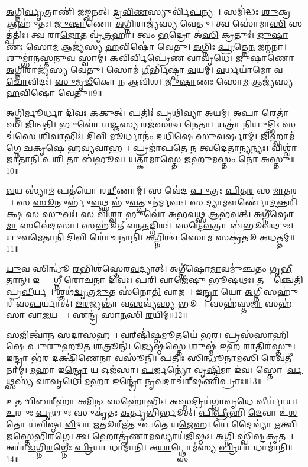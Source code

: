 \ul{𑌅}𑌗𑍍𑌨𑌿\ul{𑌰𑍍𑌵𑍃}𑌤𑍍𑌰𑌾𑌣𑌿॑ 𑌜𑌙𑍍𑌘𑌨𑌤𑍍।
\ul{𑌦𑍍𑌰}\ul{𑌵𑌿}\ul{𑌣}𑌸𑍍𑌯𑍁𑌰𑍍𑌵𑌿॑\ul{𑌪}𑌨𑍍𑌯𑌯𑌾᳚।
𑌸𑌮𑌿॑𑌦𑍍𑌧𑌃 \ul{𑌶𑍁}𑌕𑍍𑌰 𑌆𑌹𑍁॑𑌤𑌃।
\ul{𑌜𑍁}\ul{𑌷𑌾}𑌣𑍋 \ul{𑌅}𑌗𑍍𑌨𑌿𑌰𑌾𑌜𑍍𑌯॑𑌸𑍍𑌯 𑌵𑍇𑌤𑍁।
𑌤𑍍𑌵 𑌸𑍋॑𑌮𑌾\ul{𑌸𑌿} 𑌸𑌤𑍍𑌪॑𑌤𑌿𑌃।
𑌤𑍍𑌵 𑌰𑌾\ul{𑌜𑍋}𑌤 𑌵𑍃॑\ul{𑌤𑍍𑌰}𑌹𑌾।
𑌤𑍍𑌵𑌂 \ul{𑌭}𑌦𑍍𑌰𑍋 𑌅॑\ul{𑌸𑌿} 𑌕𑍍𑌰𑌤𑍁𑌃॑।
\ul{𑌜𑍁}\ul{𑌷𑌾}𑌣𑌃 𑌸𑍋\ul{𑌮} 𑌆𑌜𑍍𑌯॑𑌸𑍍𑌯 \ul{𑌹}𑌵𑌿𑌷𑍋॑ 𑌵𑍇𑌤𑍁।
\ul{𑌅}𑌗𑍍𑌨𑌿𑌃 \ul{𑌪𑍍𑌰}𑌤𑍍𑌨𑍇\ul{𑌨} 𑌜𑌨𑍍𑌮॑𑌨𑌾।
𑌶𑍁𑌮𑍍𑌭𑌾॑𑌨\ul{𑌸𑍍𑌤}𑌨𑍁\ul{𑌵}\ul{} 𑌸𑍍𑌵𑌾𑌮𑍍।
\ul{𑌕}𑌵𑌿𑌰𑍍𑌵𑌿𑌪𑍍𑌰𑍇॑𑌣 𑌵𑌾𑌵𑍃𑌧𑍇।
\ul{𑌜𑍁}\ul{𑌷𑌾}𑌣𑍋 \ul{𑌅}𑌗𑍍𑌨𑌿𑌰𑌾𑌜𑍍𑌯॑𑌸𑍍𑌯 𑌵𑍇𑌤𑍁।
𑌸𑍋𑌮॑ \ul{𑌗𑍀}𑌰𑍍𑌭𑌿𑌷𑍍𑌟𑍍𑌵𑌾॑ \ul{𑌵}𑌯𑌮𑍍।
\ul{𑌵}𑌰𑍍𑌧𑌯𑌾॑𑌮𑍋 𑌵\ul{𑌚𑍋}𑌵𑌿𑌦𑌃॑।
\ul{𑌸𑍁}\ul{𑌮𑍃}\ul{𑌡𑍀}𑌕𑍋 \ul{𑌨} 𑌆𑌵𑌿॑𑌶।
\ul{𑌜𑍁}\ul{𑌷𑌾}𑌣𑌃 𑌸𑍋\ul{𑌮} 𑌆𑌜𑍍𑌯॑𑌸𑍍𑌯 \ul{𑌹}𑌵𑌿𑌷𑍋॑ 𑌵𑍇𑌤𑍁॥9॥\anuvakamend[𑌸𑍍𑌵𑌾\dng{ꣳ} 𑌷𑌟𑍍 𑌚॑]

\ul{𑌅}𑌗𑍍𑌨𑌿\ul{𑌰𑍍𑌮𑍂}𑌰𑍍𑌧𑌾 \ul{𑌦𑌿}𑌵𑌃 \ul{𑌕}𑌕𑍁𑌤𑍍।
𑌪𑌤𑌿𑌃॑ 𑌪𑍃\ul{𑌥𑌿}𑌵𑍍𑌯𑌾 \ul{𑌅}𑌯𑌮𑍍।
\ul{𑌅}𑌪𑌾 𑌰𑍇𑌤𑌾॑𑌸𑌿 𑌜𑌿𑌨𑍍𑌵𑌤𑌿।
𑌭𑍁𑌵𑍋॑ \ul{𑌯}𑌜𑍍𑌞\ul{𑌸𑍍𑌯} 𑌰𑌜॑𑌸𑌶𑍍𑌚 \ul{𑌨𑍇}𑌤𑌾।
𑌯𑌤𑍍𑌰𑌾॑ \ul{𑌨𑌿}𑌯𑍁\ul{𑌦𑍍𑌭𑌿𑌃} 𑌸𑌚॑𑌸𑍇 \ul{𑌶𑌿}𑌵𑌾𑌭𑌿𑌃॑।
\ul{𑌦𑌿}𑌵𑌿 \ul{𑌮𑍂}𑌰𑍍𑌧𑌾𑌨𑌂॑ 𑌦𑌧𑌿𑌷𑍇 𑌸𑍁\ul{𑌵}\ul{𑌰𑍍}𑌷𑌾𑌮𑍍।
\ul{𑌜𑌿}𑌹𑍍𑌵𑌾𑌮॑𑌗𑍍𑌨𑍇 𑌚𑌕𑍃𑌷𑍇 𑌹\ul{𑌵𑍍𑌯}𑌵𑌾𑌹𑌮𑍍᳚।
𑌪𑍍𑌰𑌜𑌾॑𑌪\ul{𑌤𑍇} 𑌨 𑌤𑍍𑌵\ul{𑌦𑍇}𑌤𑌾\ul{𑌨𑍍𑌯}𑌨𑍍𑌯𑌃।
𑌵𑌿𑌶𑍍𑌵𑌾॑ \ul{𑌜𑌾}𑌤𑌾\ul{𑌨𑌿} 𑌪\ul{𑌰𑌿} 𑌤𑌾 𑌬॑𑌭𑍂𑌵।
𑌯𑌤𑍍𑌕𑌾॑𑌮𑌾𑌸𑍍𑌤𑍇 𑌜\ul{𑌹𑍁}𑌮𑌸𑍍𑌤𑌂 𑌨𑍋॑ 𑌅𑌸𑍍𑌤𑍁॥10॥

\ul{𑌵}𑌯 𑌸𑍍𑌯𑌾॑\ul{𑌮} 𑌪𑌤॑𑌯𑍋 𑌰\ul{𑌯𑍀}𑌣𑌾𑌮𑍍।
𑌸 𑌵𑍇॑𑌦 \ul{𑌪𑍁}𑌤𑍍𑌰𑌃 \ul{𑌪𑌿}𑌤\ul{𑌰}\ul{} 𑌸 \ul{𑌮𑌾}𑌤𑌰𑌮𑍍᳚।
𑌸 \ul{𑌸𑍂}𑌨𑍁𑌰𑍍𑌭𑍁॑\ul{𑌵}𑌥𑍍𑌸 𑌭𑍁॑\ul{𑌵}𑌤𑍍𑌪𑍁𑌨॑𑌰𑍍𑌮𑌘𑌃।
𑌸 𑌦𑍍𑌯𑌾𑌮𑍗𑌰𑍍𑌣𑍋॑\ul{𑌦}𑌨𑍍𑌤𑌰𑌿॑\ul{𑌕𑍍𑌷}\ul{} 𑌸 𑌸𑍁𑌵𑌃॑।
𑌸 𑌵𑌿\ul{𑌶𑍍𑌵𑌾} 𑌭𑍁𑌵𑍋॑ 𑌅𑌭\ul{𑌵}𑌥𑍍𑌸 𑌆𑌭॑𑌵𑌤𑍍।
𑌅𑌗𑍍𑌨𑍀॑𑌷𑍋\ul{𑌮𑌾} 𑌸𑌵𑍇॑𑌦𑌸𑌾।
𑌸𑌹𑍂॑𑌤𑍀 𑌵𑌨\ul{𑌤}𑌙𑍍𑌗𑌿𑌰𑌃॑।
𑌸𑌨𑍍𑌦𑍇॑\ul{𑌵}𑌤𑍍𑌰𑌾 𑌬॑𑌭𑍂𑌵𑌥𑍁𑌃।
\ul{𑌯𑍁}𑌵\ul{𑌮𑍇}𑌤𑌾𑌨𑌿॑ \ul{𑌦𑌿}𑌵𑌿 𑌰𑍋॑\ul{𑌚}𑌨𑌾𑌨𑌿॑।
\ul{𑌅}𑌗𑍍𑌨𑌿𑌶𑍍𑌚॑ 𑌸𑍋\ul{𑌮} 𑌸𑌕𑍍𑌰॑𑌤𑍂 𑌅𑌧𑌤𑍍𑌤𑌮𑍍॥11॥

\ul{𑌯𑍁}𑌵 𑌸𑌿𑌨𑍍𑌧𑍂॑ \ul{𑌰}𑌭𑌿𑌶॑𑌸𑍍𑌤𑍇𑌰\ul{𑌵}𑌦𑍍𑌯𑌾𑌤𑍍।
𑌅𑌗𑍍𑌨𑍀॑𑌷𑍋\ul{𑌮𑌾}𑌵𑌮𑍁॑𑌞𑍍𑌚𑌤𑌂 𑌗𑍃\ul{𑌭𑍀}𑌤𑌾𑌨𑍍।
𑌇𑌨𑍍𑌦𑍍𑌰𑌾᳚𑌗𑍍𑌨𑍀 𑌰𑍋\ul{𑌚}𑌨𑌾 \ul{𑌦𑌿}𑌵𑌃।
𑌪\ul{𑌰𑌿} 𑌵𑌾𑌜𑍇॑𑌷𑍁 𑌭𑍂𑌷𑌥𑌃।
𑌤𑌦𑍍𑌵𑌾᳚𑌞𑍍𑌚𑍇\ul{𑌤𑌿} 𑌪𑍍𑌰\ul{𑌵𑍀}𑌰𑍍𑌯𑌮𑍍᳚।
𑌶𑍍𑌞𑌥॑\ul{𑌦𑍍𑌵𑍃}𑌤𑍍𑌰\ul{𑌮𑍁}𑌤 𑌸॑𑌨𑍋\ul{𑌤𑌿} 𑌵𑌾𑌜𑌮𑍍᳚।
𑌇\ul{𑌨𑍍𑌦𑍍𑌰𑌾} 𑌯𑍋 \ul{𑌅}𑌗𑍍𑌨𑍀 𑌸𑌹𑍁॑𑌰𑍀 𑌸\ul{𑌪}𑌰𑍍𑌯𑌾𑌤𑍍।
\ul{𑌇}\ul{𑌰}𑌜𑍍𑌯𑌨𑍍𑌤𑌾॑ 𑌵\ul{𑌸}𑌵𑍍𑌯॑\ul{𑌸𑍍𑌯} 𑌭𑍂𑌰𑍇𑌃᳚।
𑌸𑌹॑𑌸𑍍𑌤\ul{𑌮𑌾} 𑌸𑌹॑𑌸𑌾 𑌵𑌾\ul{𑌜}𑌯𑌨𑍍𑌤𑌾᳚।
𑌏𑌨𑍍𑌦𑍍𑌰॑ 𑌸𑌾\ul{𑌨}𑌸𑌿 \ul{𑌰}𑌯𑌿𑌮𑍍॥12॥

\ul{𑌸}𑌜𑌿𑌤𑍍𑌵𑌾॑𑌨 𑌸\ul{𑌦𑌾}𑌸𑌹𑌮𑍍᳚।
𑌵𑌰𑍍‌\mbox{}𑌷𑌿॑𑌷𑍍𑌠\ul{𑌮𑍂}𑌤𑌯𑍇॑ 𑌭𑌰।
𑌪𑍍𑌰𑌸॑𑌸𑌾𑌹𑌿𑌷𑍇 𑌪𑍁𑌰𑍁𑌹𑍂\ul{𑌤} 𑌶𑌤𑍍𑌰𑍂𑌨𑍍॑।
𑌜𑍍𑌯𑍇𑌷𑍍𑌠॑\ul{𑌸𑍍𑌤𑍇} 𑌶𑍁𑌷𑍍𑌮॑ \ul{𑌇}𑌹 \ul{𑌰𑌾}𑌤𑌿𑌰॑𑌸𑍍𑌤𑍁।
𑌇𑌨𑍍𑌦𑍍𑌰𑌾 𑌭॑\ul{𑌰} 𑌦𑌕𑍍𑌷𑌿॑𑌣𑍇\ul{𑌨𑌾} 𑌵𑌸𑍂॑𑌨𑌿।
𑌪\ul{𑌤𑌿𑌃} 𑌸𑌿𑌨𑍍𑌧𑍂॑𑌨𑌾𑌮𑌸𑌿 \ul{𑌰𑍇}𑌵𑌤𑍀॑𑌨𑌾𑌮𑍍।
\ul{𑌮}𑌹𑌾 𑌇\ul{𑌨𑍍𑌦𑍍𑌰𑍋} 𑌯 𑌓𑌜॑𑌸𑌾।
\ul{𑌪}𑌰𑍍𑌜𑌨𑍍𑌯𑍋॑ 𑌵𑍃\ul{𑌷𑍍𑌟𑌿}𑌮𑌾 𑌇॑𑌵।
𑌸𑍍𑌤𑍋𑌮𑍈᳚\ul{𑌰𑍍𑌵}𑌥𑍍𑌸𑌸𑍍𑌯॑ 𑌵𑌾𑌵𑍃𑌧𑍇।
\ul{𑌮}𑌹𑌾 𑌇𑌨𑍍𑌦𑍍𑌰𑍋॑ \ul{𑌨𑍃}𑌵𑌦𑌾𑌚॑𑌰𑍍‌\mbox{}𑌷\ul{𑌣𑌿}𑌪𑍍𑌰𑌾𑌃॥13॥

\ul{𑌉}𑌤 \ul{𑌦𑍍𑌵𑌿}𑌬𑌰𑍍‌\mbox{}𑌹𑌾॑ 𑌅\ul{𑌮𑌿}𑌨𑌃 𑌸𑌹𑍋॑𑌭𑌿𑌃।
\ul{𑌅}\ul{𑌸𑍍𑌮}𑌦𑍍𑌰𑌿𑌯॑𑌗𑍍𑌵𑌾𑌵𑍃𑌧𑍇 \ul{𑌵𑍀}𑌰𑍍𑌯𑌾॑𑌯।
\ul{𑌉}𑌰𑍁𑌃 \ul{𑌪𑍃}𑌥𑍁𑌃 𑌸𑍁𑌕𑍃॑𑌤𑌃 \ul{𑌕}𑌰𑍍𑌤𑍃𑌭𑌿॑𑌰𑍍𑌭𑍂𑌤𑍍।
\ul{𑌪𑌿}\ul{𑌪𑍍𑌰𑍀}𑌹𑌿 \ul{𑌦𑍇}𑌵𑌾 𑌉॑\ul{𑌶}𑌤𑍋 𑌯॑𑌵𑌿𑌷𑍍𑌠।
\ul{𑌵𑌿}𑌦𑍍𑌵𑌾 \ul{𑌋}𑌤𑍂𑌰𑍍\mbox{}𑌋॑𑌤𑍁𑌪𑌤𑍇 𑌯\ul{𑌜𑍇}𑌹।
𑌯𑍇 𑌦𑍈𑌵𑍍𑌯𑌾॑ \ul{𑌋}𑌤𑍍𑌵𑌿\ul{𑌜}𑌸𑍍𑌤𑍇𑌭𑌿॑𑌰𑌗𑍍𑌨𑍇।
𑌤𑍍𑌵 𑌹𑍋𑌤𑍄॑𑌣𑌾\ul{𑌮}𑌸𑍍𑌯𑌾𑌯॑𑌜𑌿𑌷𑍍𑌠𑌃।
\ul{𑌅}𑌗𑍍𑌨𑌿 𑌸𑍍𑌵𑌿॑\ul{𑌷𑍍𑌟}𑌕𑍃𑌤𑌮𑍍᳚।
𑌅𑌯𑌾॑\ul{𑌡}𑌗𑍍𑌨𑌿\ul{𑌰}𑌗𑍍𑌨𑍇𑌃 \ul{𑌪𑍍𑌰𑌿}𑌯𑌾 𑌧𑌾𑌮𑌾॑𑌨𑌿।
𑌅\ul{𑌯𑌾}𑌟𑍍𑌥𑍍𑌸𑍋𑌮॑𑌸𑍍𑌯 \ul{𑌪𑍍𑌰𑌿}𑌯𑌾 𑌧𑌾𑌮𑌾॑𑌨𑌿॥14॥

